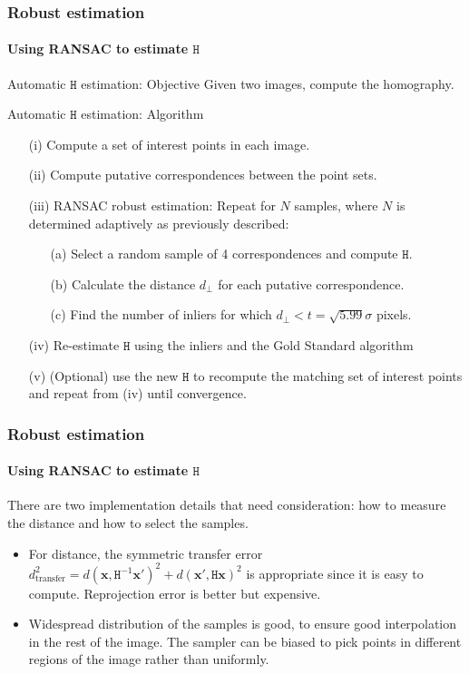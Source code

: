 \documentclass[aspectratio=169]{beamer}
\renewcommand{\vec}[1]{\boldsymbol{#1}}
\newcommand{\mat}[1]{\mathtt{#1}}
\begin{document}
\begin{frame}
\frametitle{Robust estimation}
\framesubtitle{Using RANSAC to estimate $\mat{H}$}

\begin{block}{Automatic $\mat{H}$ estimation: Objective}
  Given two images, compute the homography.
\end{block}

\begin{block}{Automatic $\mat{H}$ estimation: Algorithm}
\begin{itemize}
\item[(i)] Compute a set of \alert{interest points} in each image.
\item[(ii)] Compute \alert{putative correspondences} between the point
  sets.
\item[(iii)] \alert{RANSAC robust estimation}: Repeat for $N$ samples,
  where $N$ is determined adaptively as previously described:
  \begin{itemize}
  \item[(a)] Select a random sample of 4 correspondences and compute
    $\mat{H}$.
  \item[(b)] Calculate the distance $d_{\perp}$ for each putative
    correspondence.
  \item[(c)] Find the number of inliers for which $d_{\perp} < t =
    \sqrt{5.99}\sigma$ pixels.
  \end{itemize}
\item[(iv)] Re-estimate $\mat{H}$ using the inliers and the Gold
  Standard algorithm
\item[(v)] (Optional) use the new $\mat{H}$ to recompute the matching set of
  interest points and repeat from (iv) until convergence.
\end{itemize}
\end{block}

\end{frame}

\begin{frame}
\frametitle{Robust estimation}
\framesubtitle{Using RANSAC to estimate $\mat{H}$}

There are two implementation details that need consideration: how to
measure the distance and how to select the samples.
\begin{itemize}
\item For distance, the \alert{symmetric transfer error}
  $d^2_{\text{transfer}} = d(\vec{x},\mat{H}^{-1}\vec{x}')^2 +
  d(\vec{x}',\mat{H}\vec{x})^2$ is appropriate since it is easy to
  compute.  Reprojection error is better but expensive.
\item Widespread distribution of the samples is good, to ensure good
  interpolation in the rest of the image.  The sampler can be biased
  to pick points in different regions of the image rather than
  uniformly.
\end{itemize}

\end{frame}
\end{document}
